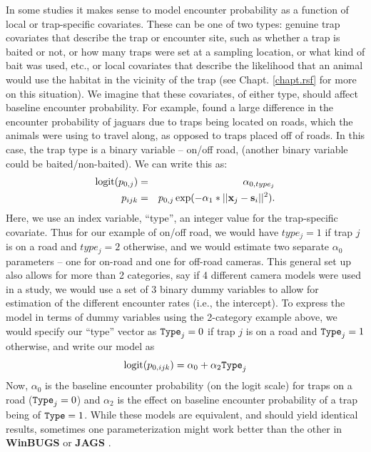 In some studies it makes sense to model encounter probability as a
function of local or trap-specific covariates. These can be one of two
types: genuine trap covariates that describe the trap or encounter site,
such as whether a trap is baited or not, or how many traps were set at a sampling location,
or what kind of bait was used, etc., or local covariates that
describe the likelihood that an animal would use the habitat in the
vicinity of the trap (see Chapt. \ref{chapt.rsf} for more on this situation).
We imagine that these covariates, of either type, should affect
baseline encounter probability.
For example, \citet{sollmann_etal:2011}
found a large difference in the encounter probability of jaguars due to traps
being located on roads, which the animals were using to travel along, as
opposed to traps placed off of roads.  In this case, the trap
type is a binary variable -- on/off road,
(another binary variable could be baited/non-baited).  We can write
this 
as:
\begin{eqnarray*}
\mbox{logit}(p_{0,j}) &= &\alpha_{0,type_j}  \\
p_{ijk}  & = & p_{0,j} \exp(- \alpha_1*||{\bf x}_{j}-{\bf s}_{i}||^2).
\end{eqnarray*}
Here, we use an index variable, ``type'', an integer 
value for the trap-specific covariate. 
Thus for our example of on/off
road, we would have $type_j = 1$ if trap $j$ is on a road and $type_j =
2$ otherwise, and we would estimate two separate $\alpha_{0}$
parameters -- one for
on-road and one for off-road cameras.  This general set up also allows
for more than 2 categories, say if  4 different camera models were
used in a study, we would use a set of 3 binary dummy variables to
allow for
estimation of the different encounter rates (i.e., the intercept). 
To express the model in terms of dummy variables using 
the 2-category example above, we would
specify our ``type'' vector as $\mbox{\tt Type}_j = 0$ if trap $j$ is on a road and
$\mbox{\tt Type}_j = 1$ otherwise, and write our model as
\[
\mbox{logit}(p_{0,ijk}) = \alpha_{0} + \alpha_{2} \mbox{\tt Type}_{j}
\]
Now, $\alpha_{0}$ is the baseline encounter probability (on the logit
scale) for traps on a road ($\mbox{\tt Type}_j = 0$) and $\alpha_{2}$ is the effect on
baseline encounter probability 
of a trap being of $\mbox{\tt Type} = 1$. While these models are
equivalent, and should
yield identical results, sometimes one parameterization might work
better than the other in {\bf WinBUGS} or {\bf JAGS}
\citep{kery:2010}.

